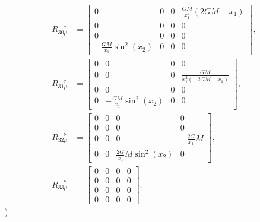 \documentclass[10pt,onecolumn,dvipdfmx]{article}
\begin{document}
\begin{align}
R_{30\mu }^{\ \ \ \ \nu } &=\left[\begin{matrix}0 & 0 & 0 & \frac{G M}{x_{1}^{4}} \left(2 G M - x_{1}\right)\\0 & 0 & 0 & 0\\0 & 0 & 0 & 0\\- \frac{G M}{x_{1}} \sin^{2}{\left (x_{2} \right )} & 0 & 0 & 0\end{matrix}\right], \\
R_{31\mu }^{\ \ \ \ \nu } &=\left[\begin{matrix}0 & 0 & 0 & 0\\0 & 0 & 0 & \frac{G M}{x_{1}^{2} \left(- 2 G M + x_{1}\right)}\\0 & 0 & 0 & 0\\0 & - \frac{G M}{x_{1}} \sin^{2}{\left (x_{2} \right )} & 0 & 0\end{matrix}\right], \\
R_{32\mu }^{\ \ \ \ \nu } &=\left[\begin{matrix}0 & 0 & 0 & 0\\0 & 0 & 0 & 0\\0 & 0 & 0 & - \frac{2 G}{x_{1}} M\\0 & 0 & \frac{2 G}{x_{1}} M \sin^{2}{\left (x_{2} \right )} & 0\end{matrix}\right], \\
R_{33\mu }^{\ \ \ \ \nu } &=\left[\begin{matrix}0 & 0 & 0 & 0\\0 & 0 & 0 & 0\\0 & 0 & 0 & 0\\0 & 0 & 0 & 0\end{matrix}\right].
\end{align}
)
\end{document}
